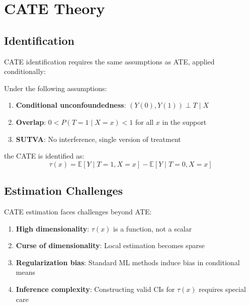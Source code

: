 \section{CATE Theory}\label{sec:ch09_cate_theory}

\subsection{Identification}

CATE identification requires the same assumptions as ATE, applied conditionally:

\begin{theorem}
\label{thm:cate_identification}
Under the following assumptions:
\begin{enumerate}
    \item \textbf{Conditional unconfoundedness}: $(Y(0), Y(1)) \perp T \mid X$
    \item \textbf{Overlap}: $0 < P(T = 1 \mid X = x) < 1$ for all $x$ in the support
    \item \textbf{SUTVA}: No interference, single version of treatment
\end{enumerate}
the CATE is identified as:
\begin{equation}
\tau(x) = \mathbb{E}[Y \mid T = 1, X = x] - \mathbb{E}[Y \mid T = 0, X = x]
\end{equation}
\end{theorem}

\subsection{Estimation Challenges}

CATE estimation faces challenges beyond ATE:

\begin{enumerate}
    \item \textbf{High dimensionality}: $\tau(x)$ is a function, not a scalar
    \item \textbf{Curse of dimensionality}: Local estimation becomes sparse
    \item \textbf{Regularization bias}: Standard ML methods induce bias in conditional means
    \item \textbf{Inference complexity}: Constructing valid CIs for $\tau(x)$ requires special care
\end{enumerate}

